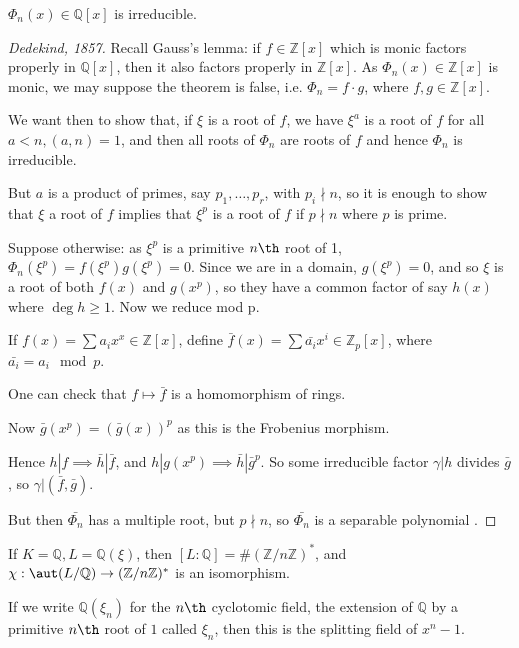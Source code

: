 \documentclass[a4paper, 10pt, twocolumn]{amsart}
\begin{document}
\begin{theorem}
$\Phi_n(x) \in \mathbb{Q}[x]$ is irreducible.
\end{theorem}
\begin{proof}[Dedekind, 1857]
Recall Gauss's lemma: if $f\in \mathbb{Z}[x]$ which is monic factors properly in $\mathbb{Q}[x]$, then it also factors properly in $\mathbb{Z}[x]$. As $\Phi_n(x) \in \mathbb{Z}[x]$ is monic, we may suppose the theorem is false, i.e. $\Phi_n = f\cdot g$, where $f,g \in \mathbb{Z}[x]$.

We want then to show that, if $\xi$ is a root of $f$, we have $\xi^a$ is a root of $f$ for all $a<n, (a,n)=1$, and then all roots of $\Phi_n$ are roots of $f$ and hence $\Phi_n$ is irreducible.

But $a$ is a product of primes, say $p_1, \ldots, p_r$, with $p_i \nmid n$, so it is enough to show that $\xi$ a root of $f$ implies that $\xi^p$ is a root of $f$ if $p\nmid n$ where $p$ is prime.

Suppose otherwise: as $\xi^p$ is a primitive $n\th$ root of 1, $\Phi_n(\xi^p) = f(\xi^p)g(\xi^p) = 0$. Since we are in a domain, $g(\xi^p) = 0$, and so $\xi$ is a root of both $f(x)$ and $g(x^p)$, so they have a common factor of say $h(x)$ where $\deg h \geq 1$. Now we reduce mod p.

If $f(x) = \sum a_i x^x \in \mathbb{Z}[x]$, define $\bar{f}(x) = \sum \bar{a_i}x^i \in \mathbb{Z}_p[x]$, where $\bar{a_i} = a_i \mod p$.

One can check that $f \mapsto \bar{f}$ is a homomorphism of rings.

Now $\bar{g}(x^p) = (\bar{g}(x))^p$ as this is the Frobenius morphism.

Hence $h|f \implies \bar{h}|\bar{f}$, and $h|g(x^p) \implies \bar{h}|\bar{g}^p$. So some irreducible factor $\gamma |h$ divides $\bar{g}$, so $\gamma|(\bar{f},\bar{g})$.

But then $\bar{\Phi_n}$ has a multiple root, but $p\nmid n$, so $\bar{\Phi_n}$ is a separable polynomial \contr.
\end{proof}
\begin{corollary}
If $K=\mathbb{Q}, L=\mathbb{Q}(\xi)$, then $[L:\mathbb{Q}] = \#(\mathbb{Z}/n\mathbb{Z})^{\ast}$, and $\chi:\aut(L/\mathbb{Q}) \to (\mathbb{Z}/n\mathbb{Z})^{\ast}$ is an isomorphism.
\end{corollary}
If we write $\mathbb{Q}(\xi_n)$ for the $n\th$ cyclotomic field, the extension of $\mathbb{Q}$ by a primitive $n\th$ root of $1$ called $\xi_n$, then this is the splitting field of $x^n-1$.
\end{document}
